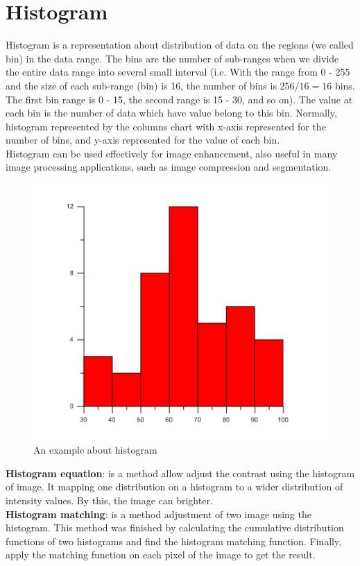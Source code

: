 \section{Histogram}
Histogram is a representation about distribution of data on the regions (we called bin) in the data range. The bins are the number of sub-ranges when we divide the entire data range into several small interval (i.e. With the range from 0 - 255 and the size of each sub-range (bin) is 16, the number of bins is $256/16 = 16$ bins. The first bin range is 0 - 15, the second range is 15 - 30, and so on). The value at each bin is the number of data which have value belong to this bin. Normally, histogram represented by the columns chart with x-axis represented for the number of bins, and y-axis represented for the value of each bin.\\
Histogram can be used effectively for image enhancement, also useful in many image processing applications, such as image compression and segmentation.\\[0.3cm]
\begin{figure}[h!]
\centering
\includegraphics[scale=2]{images/histogram}
\caption{An example about histogram}
\label{fig:figure_31}
\end{figure}
\textbf{Histogram equation}: is a method allow adjust the contrast using the histogram of image. It mapping one distribution on a histogram to a wider distribution of intensity values. By this, the image can brighter.\\[0.2cm]
\textbf{Histogram matching}: is a method adjustment of two image using the histogram. This method was finished by calculating the cumulative distribution functions of two histograms and find the histogram matching function. Finally, apply the matching function on each pixel of the image to get the result.
